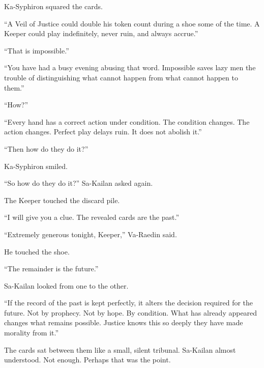 Ka-Syphiron squared the cards.\par

“A Veil of Justice could double his token count during a shoe some of the time.
A Keeper could play indefinitely, never ruin, and always accrue.”\par

“That is impossible.”\par

“You have had a busy evening abusing that word.
Impossible saves lazy men the trouble of distinguishing what cannot happen from what cannot happen to them.”\par

“How?”\par

“Every hand has a correct action under condition.
The condition changes.
The action changes.
Perfect play delays ruin.
It does not abolish it.”\par

“Then how do they do it?”\par

Ka-Syphiron smiled.\par

“So how do they do it?” Sa-Kailan asked again.\par

The Keeper touched the discard pile.\par

“I will give you a clue.
The revealed cards are the past.”\par

“Extremely generous tonight, Keeper,” Va-Raedin said.\par

He touched the shoe.\par

“The remainder is the future.”\par

Sa-Kailan looked from one to the other.\par

“If the record of the past is kept perfectly, it alters the decision required for the future.
Not by prophecy.
Not by hope.
By condition.
What has already appeared changes what remains possible.
Justice knows this so deeply they have made morality from it.”\par

The cards sat between them like a small, silent tribunal.
Sa-Kailan almost understood.
Not enough.
Perhaps that was the point.\par


